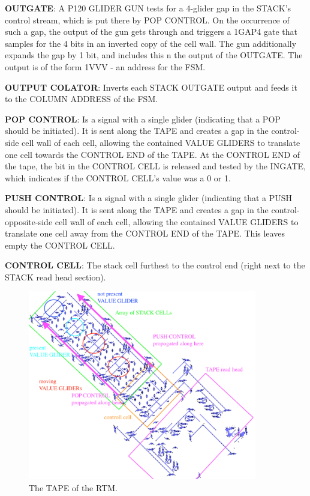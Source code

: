 \documentclass{article}
\begin{document}
\vspace{1em}

\noindent\textbf{OUTGATE}: A P120 GLIDER GUN tests for a 4-glider gap in the STACK's control stream, which is put there by POP CONTROL. On the occurrence of such a gap, the output of the gun gets through and triggers a 1GAP4 gate that samples for the 4 bits in an inverted copy of the cell wall. The gun additionally expands the gap by 1 bit, and includes this n the output of the OUTGATE. The output is of the form 1VVV - an address for the FSM.

\vspace{1em}

\noindent\textbf{OUTPUT COLATOR}: Inverts each STACK OUTGATE output and feeds it to the COLUMN ADDRESS of the FSM.

\vspace{1em}

\noindent\textbf{POP CONTROL}: Is a signal with a single glider (indicating that a POP should be initiated). It is sent along the TAPE and creates a gap in the control-side cell wall of each cell, allowing the contained VALUE GLIDERS to translate one cell towards the CONTROL END of the TAPE. At the CONTROL END of the tape, the bit in the CONTROL CELL is released and tested by the INGATE, which indicates if the CONTROL CELL's value was a 0 or 1.

\vspace{1em}

\noindent\textbf{PUSH CONTROL}: Is a signal with a single glider (indicating that a PUSH should be initiated). It is sent along the TAPE and creates a gap in the control-opposite-side cell wall of each cell, allowing the contained VALUE GLIDERS to translate one cell away from the CONTROL END of the TAPE. This leaves empty the CONTROL CELL.

\vspace{1em}

\noindent\textbf{CONTROL CELL}: The stack cell furthest to the control end (right next to the STACK read head section).

\vspace{1em}

\begin{figure}[h]
\centering
\includegraphics[width=10cm,keepaspectratio]{images/TAPE.png}
\captionsetup{labelformat=empty} \caption{The TAPE of the RTM.}
\end{figure}
\end{document}
